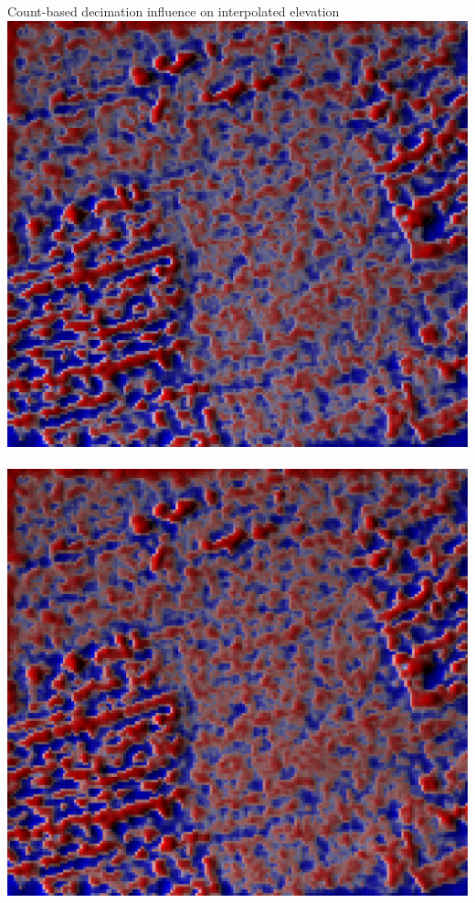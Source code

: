 \documentclass[xcolor={dvipsnames,usenames},beamer,aspectratio=43]{beamer}
\begin{document}
\begin{frame}{Count-based decimation influence on interpolated elevation}
\includegraphics[width=\imgsize]{uav_all_lrm_shaded}%
~%
\includegraphics[width=\imgsize]{uav_skip_5_lrm_shaded}%
~%

\end{frame}
\end{document}
